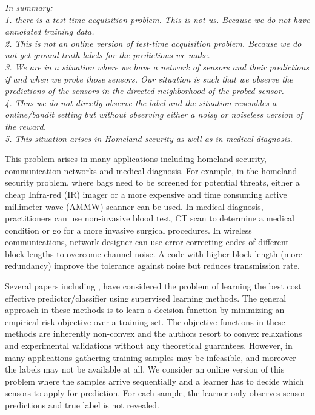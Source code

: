 \documentclass{article}
\begin{document}
{\it In summary: \\
	1. there is a test-time acquisition problem. This is not us. Because we do not have annotated training data. \\
	2. This is not an online version of test-time acquisition problem. Because we do not get ground truth labels for the predictions we make.\\
	3. We are in a situation where we have a network of sensors and their predictions if and when we probe those sensors. Our situation is such that we observe the predictions of the sensors in the directed neighborhood of the probed sensor.\\
	4. Thus we do not directly observe the label and the situation resembles a online/bandit setting but without observing either a noisy or noiseless version of the reward.\\
	5. This situation arises in Homeland security as well as in medical diagnosis.}

This problem arises in many applications including homeland security, communication networks and medical diagnosis. For example, in the homeland security problem, where bags need to be screened for potential threats, either a cheap Infra-red (IR) imager or a more expensive and time consuming active millimeter wave (AMMW) scanner can be used. In medical diagnosis, practitioners can use non-invasive blood test, CT scan to determine a medical condition or go for a more invasive surgical procedures. In wireless communications, network designer can use error correcting codes of different block lengths to overcome channel noise. A code with higher block length (more redundancy)  improve the tolerance against noise but reduces transmission rate. 
     
Several papers including \cite{AISTATS13_SupervisedSequentialLearning_TrapezSaligram},\cite{ML13_MultistageClassifier_TrapezSaligramaCastanon}\cite{ICML13_CostSensitiveTreeClassification_XuKusnerChenWeinberger} have considered the problem of learning the best cost effective predictor/classifier using supervised learning methods. The general approach in these methods is to learn a decision function by minimizing an empirical risk objective over a training set. The objective functions in these methods are inherently non-convex and the authors resort to convex relaxations and experimental validations without any theoretical guarantees. However, in many applications gathering training samples may be infeasible, and moreover the labels may not be available at all. We consider an online version of this problem where the samples arrive sequentially and a learner has to decide which sensors to apply for prediction. For each sample, the learner only observes sensor predictions and true label is not revealed. 
\end{document}

